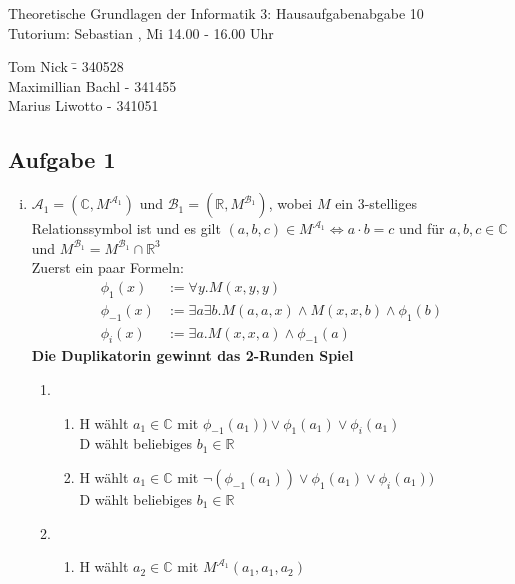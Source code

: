 \documentclass[a4paper,10pt]{article}
\begin{document}
\begin{center}
\Large{Theoretische Grundlagen der Informatik 3: Hausaufgabenabgabe 10} \\
\large{Tutorium: Sebastian , Mi 14.00 - 16.00 Uhr}
\end{center}
\begin{tabbing}
Tom Nick \hspace{2cm}\= - 340528\\
Maximillian Bachl \> - 341455 \\
Marius Liwotto\> -  341051
\end{tabbing}
\subsection*{Aufgabe 1}
\begin{enumerate}[(i)]
	\item $\mathcal{A}_1 = (\mathbb{C},M^{\mathcal{A}_1})$ und $\mathcal{B}_1 = (\mathbb{R}, M^{\mathcal{B}_1})$, wobei $M$ ein 3-stelliges Relationssymbol ist und es gilt $(a,b,c) \in M^{\mathcal{A}_1} \Leftrightarrow a \cdot b = c$ und für $a,b,c \in \mathbb{C}$ und $M^{\mathcal{B}_1} = M^{\mathcal{B}_1} \cap \mathbb{R}^3$ \\
	Zuerst ein paar Formeln: 
	\begin{align*}
		\phi_1(x) &:= \forall y.M(x,y,y) \\
		\phi_{-1}(x) &:= \exists a \exists b. M(a, a, x) \land M(x,x,b) \land \phi_1(b) \\
		\phi_{i}(x) &:= \exists a.M(x, x, a) \land \phi_{-1}(a)
	\end{align*}
	\textbf{Die Duplikatorin gewinnt das 2-Runden Spiel}
		\begin{enumerate}[1. \text{Zug:}]
			\item  	
			\begin{enumerate}
				\item  	H wählt $a_1 \in \mathbb{C}$ mit $\phi_{-1}(a_1)) \lor \phi_1(a_1) \lor \phi_i(a_1)$ \\
					D wählt beliebiges $b_1 \in \mathbb{R}$
				\item  	H wählt $a_1 \in \mathbb{C}$ mit $\lnot(\phi_{-1}(a_1)) \lor \phi_1(a_1) \lor \phi_i(a_1))$ \\
					D wählt beliebiges $b_1 \in \mathbb{R}$
			\end{enumerate}
			\item 
			\begin{enumerate}
				\item 	H wählt $a_2 \in \mathbb{C}$ mit $M^{\mathcal{A}_1}(a_1, a_1, a_2)$ \\

\end{enumerate}
\end{enumerate}
\end{enumerate}
\end{document}
